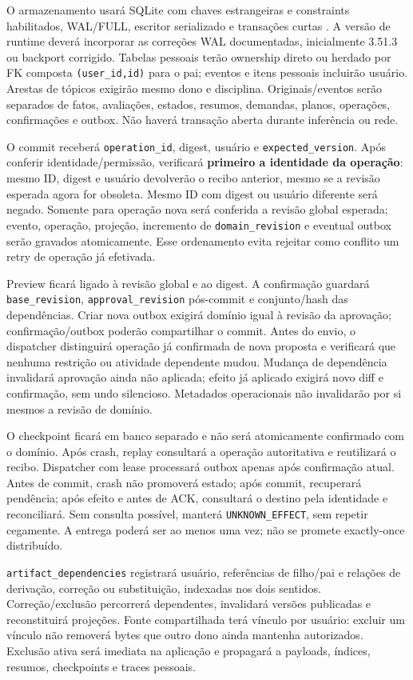 \documentclass[12pt]{article}
\let\cite\citep
\newcommand{\code}[1]{\nolinkurl{#1}}
\begin{document}
O armazenamento usará SQLite com chaves estrangeiras e constraints habilitados, WAL/FULL, escritor serializado e transações curtas \cite{sqlitewal}. A versão de runtime deverá incorporar as correções WAL documentadas, inicialmente 3.51.3 ou backport corrigido. Tabelas pessoais terão ownership direto ou herdado por FK composta \code{(user_id,id)} para o pai; eventos e itens pessoais incluirão usuário. Arestas de tópicos exigirão mesmo dono e disciplina. Originais/eventos serão separados de fatos, avaliações, estados, resumos, demandas, planos, operações, confirmações e outbox. Não haverá transação aberta durante inferência ou rede.

O commit receberá \code{operation_id}, digest, usuário e \code{expected_version}. Após conferir identidade/permissão, verificará \textbf{primeiro a identidade da operação}: mesmo ID, digest e usuário devolverão o recibo anterior, mesmo se a revisão esperada agora for obsoleta. Mesmo ID com digest ou usuário diferente será negado. Somente para operação nova será conferida a revisão global esperada; evento, operação, projeção, incremento de \code{domain_revision} e eventual outbox serão gravados atomicamente. Esse ordenamento evita rejeitar como conflito um retry de operação já efetivada.

Preview ficará ligado à revisão global e ao digest. A confirmação guardará \code{base_revision}, \code{approval_revision} pós-commit e conjunto/hash das dependências. Criar nova outbox exigirá domínio igual à revisão da aprovação; confirmação/outbox poderão compartilhar o commit. Antes do envio, o dispatcher distinguirá operação já confirmada de nova proposta e verificará que nenhuma restrição ou atividade dependente mudou. Mudança de dependência invalidará aprovação ainda não aplicada; efeito já aplicado exigirá novo diff e confirmação, sem undo silencioso. Metadados operacionais não invalidarão por si mesmos a revisão de domínio.

O checkpoint ficará em banco separado e não será atomicamente confirmado com o domínio. Após crash, replay consultará a operação autoritativa e reutilizará o recibo. Dispatcher com lease processará outbox apenas após confirmação atual. Antes de commit, crash não promoverá estado; após commit, recuperará pendência; após efeito e antes de ACK, consultará o destino pela identidade e reconciliará. Sem consulta possível, manterá \code{UNKNOWN_EFFECT}, sem repetir cegamente. A entrega poderá ser ao menos uma vez; não se promete exactly-once distribuído.

\code{artifact_dependencies} registrará usuário, referências de filho/pai e relações de derivação, correção ou substituição, indexadas nos dois sentidos. Correção/exclusão percorrerá dependentes, invalidará versões publicadas e reconstituirá projeções. Fonte compartilhada terá vínculo por usuário: excluir um vínculo não removerá bytes que outro dono ainda mantenha autorizados. Exclusão ativa será imediata na aplicação e propagará a payloads, índices, resumos, checkpoints e traces pessoais.
\end{document}
